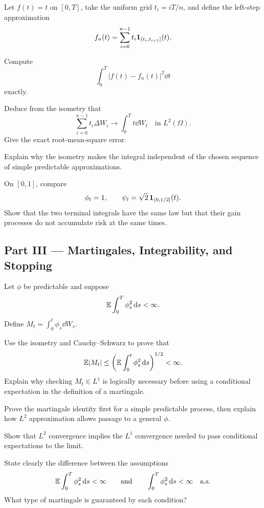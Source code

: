 \begin{exercise}
Let \(f(t)=t\) on \([0,T]\), take the uniform grid \(t_i=iT/n\), and define
the left-step approximation
\[
f_n(t)=\sum_{i=0}^{n-1}t_i\mathbf{1}_{(t_i,t_{i+1}]}(t).
\]
\begin{exparts}
  \item Compute
  \[
  \int_0^T|f(t)-f_n(t)|^2\dd t
  \]
  exactly.
  \item Deduce from the isometry that
  \[
  \sum_{i=0}^{n-1}t_i\Delta W_i
  \longrightarrow \int_0^Tt\dd W_t
  \quad\text{in }L^2(\Omega).
  \]
  Give the exact root-mean-square error.
  \item Explain why the isometry makes the integral independent of the chosen
  sequence of simple predictable approximations.
  \item On \([0,1]\), compare
  \[
  \phi_t=1,
  \qquad
  \psi_t=\sqrt2\,\mathbf{1}_{(0,1/2]}(t).
  \]
  Show that the two terminal integrals have the same law but that their gain
  processes do not accumulate risk at the same times.
\end{exparts}
\end{exercise}

\subsection*{Part III --- Martingales, Integrability, and Stopping}

\begin{exercise}
Let \(\phi\) be predictable and suppose
\[
\mathbb{E}\int_0^T\phi_s^2\,\mathrm{d} s<\infty.
\]
Define \(M_t=\int_0^t\phi_s\dd W_s\).
\begin{exparts}
  \item Use the isometry and Cauchy--Schwarz to prove that
  \[
  \mathbb{E}|M_t|
  \leq
  \left(\mathbb{E}\int_0^t\phi_s^2\,\mathrm{d} s\right)^{1/2}<\infty.
  \]
  Explain why checking \(M_t\in L^1\) is logically necessary before using a
  conditional expectation in the definition of a martingale.
  \item Prove the martingale identity first for a simple predictable process,
  then explain how \(L^2\) approximation allows passage to a general \(\phi\).
  \item Show that \(L^2\) convergence implies the \(L^1\) convergence needed
  to pass conditional expectations to the limit.
  \item State clearly the difference between the assumptions
  \[
  \mathbb{E}\int_0^T\phi_s^2\,\mathrm{d} s<\infty
  \qquad\text{and}\qquad
  \int_0^T\phi_s^2\,\mathrm{d} s<\infty\quad\text{a.s.}
  \]
  What type of martingale is guaranteed by each condition?
\end{exparts}
\end{exercise}

